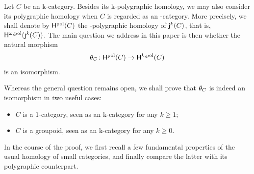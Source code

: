 \begin{paragr}\label{paragr:mainquestion}
  Let $C$ be an \ook k-category. Besides its \ook k-polygraphic
  homology, we may also consider its polygraphic homology when $C$ is regarded
  as an \oo-category. More precisely, we shall denote by $\mathsf{H}^{\mathrm{pol}}(C)$ the
  \ook{\oo}-polygraphic homology of $\mathsf{j}_{}^{k}(C)$, that is,
  $\mathsf{H}^{\omega,\mathrm{pol}}(\mathsf{j}_{}^{k}(C))$. The main question we address in this paper
  is then whether the natural morphism
  \[\theta_C\colon \mathsf{H}^{\mathrm{pol}}(C)\to \mathsf{H}^{k,\mathrm{pol}}(C)  \]
  is an isomorphism.

  Whereas the general question remains open,
  we shall prove that $\theta_C$ is indeed an isomorphism in two
  useful cases:
  \begin{itemize}
  \item $C$ is a $1$-category, seen as an \ook k-category for any $k\geq
    1$;
  \item $C$ is a groupoid, seen as an \ook k-category for any $k\geq
    0$.
  \end{itemize}
  In the course of the proof, we first recall a few fundamental
  properties of the usual homology of small categories, and finally
  compare the latter with its polygraphic counterpart.
\end{paragr}


